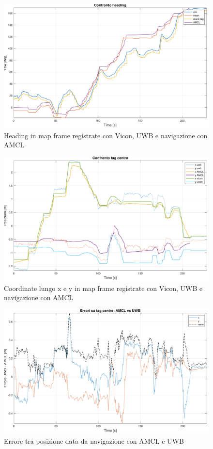 \begin{figure}[] 
	\centering    
	\includegraphics[height=.3\textheight]{grafici_stanzavolo_vicon/figure2.pdf}
	\caption{Heading in map frame registrate con Vicon, UWB e navigazione con AMCL}
	\label{fig: heading_vicon_charlie}
\end{figure}

\begin{figure}[] 
	\centering    
	\includegraphics[height=.3\textheight]{grafici_stanzavolo_vicon/figure4.pdf}
	\caption{Coordinate lungo x e y in map frame registrate con Vicon, UWB e navigazione con AMCL}
	\label{fig: assixy_vicon_charlie}
\end{figure}

\begin{figure}[] 
	\centering    
	\includegraphics[height=.3\textheight]{grafici_stanzavolo_vicon/figure12.pdf}
	\caption{Errore tra posizione data da navigazione con AMCL e UWB}
	\label{fig: amcluwb_err_vicon_charlie}
\end{figure}

